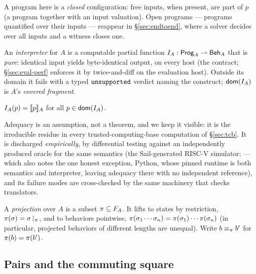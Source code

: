 A program here is a \emph{closed} configuration: free inputs, when present,
are part of $p$ (a program together with an input valuation). Open programs
--- programs quantified over their inputs --- reappear in
\S\ref{sec:endtoend}, where a solver decides over all inputs and a witness
closes one.

\begin{definition}[Interpreter]
\label{def:interpreter}
An \emph{interpreter} for $A$ is a computable partial function
$I_A : \mathsf{Prog}_{A} \rightharpoonup \mathsf{Beh}_{A}$ that is \emph{pure}: identical
input yields byte-identical output, on every host (the contract;
\S\ref{sec:eval-perf} enforces it by twice-and-diff on the evaluation
host). Outside its domain
it fails with a typed $\mathtt{unsupported}$ verdict naming the construct;
$\mathsf{dom}(I_A)$ is $A$'s \emph{covered fragment}.
\end{definition}

\begin{assumption}
\label{asm:adequacy}
$I_A(p) = \llbracket p \rrbracket_{A}$ for all $p \in \mathsf{dom}(I_A)$.
\end{assumption}

Adequacy is an assumption, not a theorem, and we keep it visible: it is the
irreducible residue in every trusted-computing-base computation of
\S\ref{sec:tcb}. It is discharged \emph{empirically}, by differential
testing against an independently produced oracle for the same semantics
(the Sail-generated RISC-V simulator;  --- which
also notes the one honest exception, Python, whose pinned runtime is
both semantics and interpreter, leaving adequacy there with no
independent reference), and its failure modes are cross-checked by the
same machinery that checks translators.

\begin{definition}[Projection]
\label{def:projection}
A \emph{projection} over $A$ is a subset $\pi \subseteq F_A$. It lifts
to states by restriction, $\pi(\sigma) = \sigma\!\restriction_{\pi}$,
and to behaviors pointwise,
$\pi(\sigma_1 \cdots \sigma_n) = \pi(\sigma_1) \cdots \pi(\sigma_n)$
(in particular, projected behaviors of different lengths are unequal).
Write $b \equiv_{\pi} b'$ for $\pi(b) = \pi(b')$.
\end{definition}

\subsection{Pairs and the commuting square}
\label{sec:pairs}

